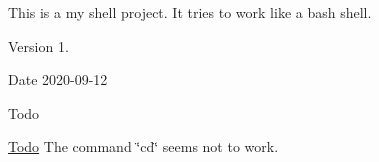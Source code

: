 This is a my shell project. It tries to work like a bash shell.

\begin{DoxyVersion}{Version}
1. 
\end{DoxyVersion}
\begin{DoxyDate}{Date}
2020-\/09-\/12
\end{DoxyDate}
\begin{DoxyRefDesc}{Todo}
\item[\mbox{\hyperlink{todo__todo000001}{Todo}}]The command \char`\"{}cd\char`\"{} seems not to work. \end{DoxyRefDesc}
